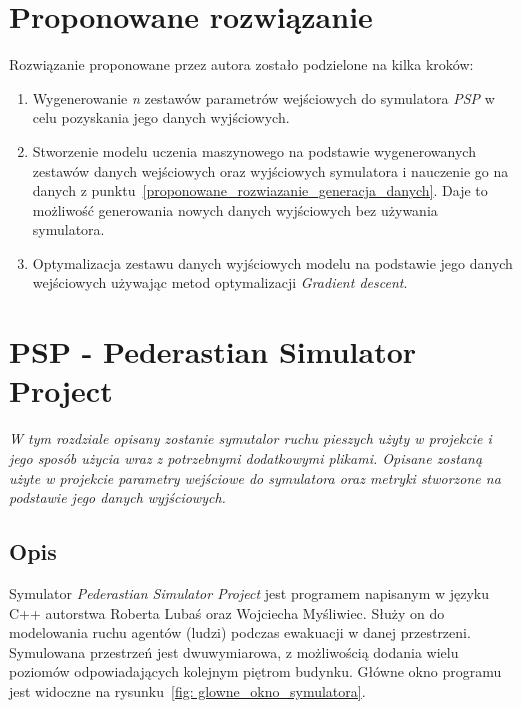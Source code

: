\documentclass[12pt]{aghdpl}
\begin{document}
	\chapter{Proponowane rozwiązanie}
	Rozwiązanie proponowane przez autora zostało podzielone na kilka kroków:
	\begin{enumerate}
	\item\label{proponowane_rozwiazanie_generacja_danych} Wygenerowanie \textit{n} zestawów parametrów wejściowych do symulatora \textit{PSP} w celu pozyskania jego danych wyjściowych.
	\item Stworzenie modelu uczenia maszynowego na podstawie wygenerowanych zestawów danych wejściowych oraz wyjściowych symulatora i nauczenie go na danych z punktu~\ref{proponowane_rozwiazanie_generacja_danych}. Daje to możliwość generowania nowych danych wyjściowych bez używania symulatora.
	\item Optymalizacja zestawu danych wyjściowych modelu na podstawie jego danych wejściowych używając metod optymalizacji \textit{Gradient descent}.
	\end{enumerate}
	
	\chapter{PSP - Pederastian Simulator Project} \label{sekcja_psp}
	\textit{W tym rozdziale opisany zostanie symutalor ruchu pieszych użyty w projekcie i jego sposób użycia wraz z potrzebnymi dodatkowymi plikami. Opisane zostaną użyte w projekcie parametry wejściowe do symulatora oraz metryki stworzone na podstawie jego danych wyjściowych.}
	
		\section{Opis}
		Symulator \textit{Pederastian Simulator Project} jest programem napisanym w języku C++ autorstwa Roberta Lubaś oraz Wojciecha Myśliwiec. Służy on do modelowania ruchu agentów (ludzi) podczas ewakuacji w danej przestrzeni. Symulowana przestrzeń jest dwuwymiarowa, z możliwością dodania wielu poziomów odpowiadających kolejnym piętrom budynku. Główne okno programu jest widoczne na rysunku~\ref{fig: glowne_okno_symulatora}.
	
\end{document}
